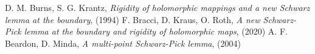 \begin{thebibliography}{widest entry}
   D. M. Burns, S. G. Krantz, \textit{Rigidity of holomorphic mappings and a new Schwarz lemma at the boundary}, (1994)
   F. Bracci, D. Kraus, O. Roth, \textit{A new Schwarz-Pick lemma at the boundary and rigidity of holomorphic maps}, (2020)
   A. F. Beardon, D. Minda, \textit{A multi-point Schwarz-Pick lemma}, (2004)
\end{thebibliography}
